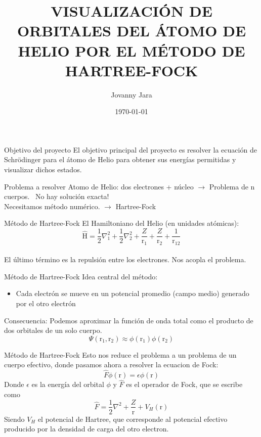 \documentclass{beamer}
\title[Visualización de orbitales del átomo de Helio mediante Hartree-Fock]{VISUALIZACIÓN DE ORBITALES DEL ÁTOMO DE HELIO POR EL MÉTODO DE HARTREE-FOCK}
\author[J. Jara]{Jovanny Jara}
\institute [Optimización y Programación GPU]{
Facultad de Ciencias \\
Licenciatura en Física \\
Universidad de Valparaíso
}
\date{\today}
\begin{document}
\begin{frame}
    \titlepage  
\end{frame}

\begin{frame}{Objetivo del proyecto}
    El objetivo principal del proyecto es resolver la ecuación de Schrödinger para el átomo de Helio para obtener sus energías permitidas y visualizar dichos estados.
\end{frame}

\begin{frame}{Problema a resolver}
    Atomo de Helio: dos electrones + núcleo $\to$ Problema de n cuerpos. \ \alert{No hay solución exacta!} 
    \pause
    \\\vspace{4mm} Necesitamos método numérico. $\to$ \alert{Hartree-Fock}
\end{frame}

\begin{frame}{Método de Hartree-Fock}
    El Hamiltoniano del Helio (en unidades atómicas):
    \begin{equation}
        \hat{\mathrm{H}} = \frac{1}{2}\nabla_1^2 + \frac{1}{2}\nabla_2^2 + \frac{Z}{\text{r}_1} + \frac{Z}{\text{r}_2} + \frac{1}{\text{r}_{12}}
    \end{equation}
    \pause 
    \\ El último término es la repulsión entre los electrones. \alert{Nos acopla el problema.}
\end{frame}

\begin{frame}{Método de Hartree-Fock}
    Idea central del método:
    \begin{itemize}
        \item Cada electrón se mueve en un potencial promedio (campo medio) generado por el otro electrón
    \end{itemize}
    \alert{Consecuencia:} Podemos aproximar la función de onda total como el producto de dos orbitales de un solo cuerpo.
    \begin{equation}
        \boxed{\Psi(\text{r}_1, \text{r}_2) \approx \phi(\text{r}_1)\phi(\text{r}_2)}
    \end{equation}
\end{frame}

\begin{frame}{Método de Hartree-Fock}
    Esto nos reduce el problema a un problema de un cuerpo efectivo, donde pasamos ahora a resolver la ecuacion de Fock:
    \begin{equation}
        \hat{F}\phi(\text{r}) = \epsilon\phi(\text{r})
    \end{equation}
    Donde $\epsilon$ es la energía del orbital $\phi$ y $\hat{F}$ es el operador de Fock, que se escribe como
    \begin{equation}
        \hat{F} = \frac{1}{2}\nabla^2 + \frac{Z}{\text{r}} + V_H(\text{r}) 
    \end{equation}
    Siendo $V_H$ el potencial de Hartree, que corresponde al potencial efectivo producido por la densidad de carga del otro electron.
\end{frame}
\end{document}
